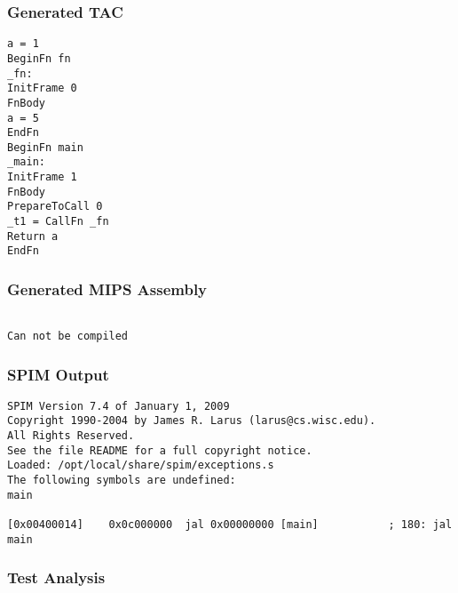 \subsubsection{Generated TAC}
\begin{lstlisting}[showstringspaces=false,breaklines=true,backgroundcolor=\color{light-gray}, captionpos=b]
a = 1
BeginFn fn
_fn:
InitFrame 0
FnBody
a = 5
EndFn
BeginFn main
_main:
InitFrame 1
FnBody
PrepareToCall 0
_t1 = CallFn _fn
Return a
EndFn

\end{lstlisting}\subsubsection{Generated MIPS Assembly}
\begin{lstlisting}[showstringspaces=false,breaklines=true,backgroundcolor=\color{light-gray}, captionpos=b]
         
Can not be compiled
\end{lstlisting}\subsubsection{SPIM Output}
\begin{verbatim}
SPIM Version 7.4 of January 1, 2009
Copyright 1990-2004 by James R. Larus (larus@cs.wisc.edu).
All Rights Reserved.
See the file README for a full copyright notice.
Loaded: /opt/local/share/spim/exceptions.s
The following symbols are undefined:
main

[0x00400014]	0x0c000000  jal 0x00000000 [main]           ; 180: jal main
\end{verbatim}\subsubsection{Test Analysis}


